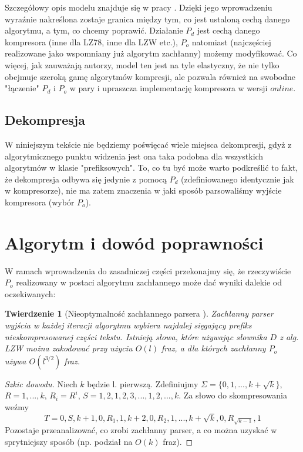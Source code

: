 \documentclass[12pt]{article}
\theoremstyle{plain}
\newtheorem{theorem}{Twierdzenie}[]
\begin{document}
Szczegółowy opis modelu znajduje się w pracy \cite{Matias98}. Dzięki jego wprowadzeniu wyraźnie nakreślona zostaje granica między tym, co jest ustaloną cechą danego algorytmu, a tym, co chcemy poprawić. Działanie $P_{d}$ jest cechą danego kompresora (inne dla LZ78, inne dla LZW etc.), $P_{o}$ natomiast (najczęściej realizowane jako wspomniany już algorytm zachłanny) możemy modyfikować.
Co więcej, jak zauważają autorzy, model ten jest na tyle elastyczny, że nie tylko obejmuje szeroką gamę algorytmów kompresji, ale pozwala również na swobodne "łączenie" $P_{d}$ i $P_{o}$ w pary i upraszcza implementację kompresora w wersji $online$.
\subsection{Dekompresja}
W niniejszym tekście nie będziemy poświęcać wiele miejsca dekompresji, gdyż z algorytmicznego punktu widzenia jest ona taka podobna dla wszystkich algorytmów w klasie "prefiksowych". To, co tu być może warto podkreślić to fakt, że dekompresja odbywa się jedynie z pomocą $P_{d}$ (zdefiniowanego identycznie jak w kompresorze), nie ma zatem znaczenia w jaki sposób parsowaliśmy wyjście kompresora (wybór $P_{o}$).
\newpage
\section{Algorytm i dowód poprawności}
W ramach wprowadzenia do zasadniczej części przekonajmy się, że rzeczywiście  $P_{o}$ realizowany w postaci algorytmu zachłannego może dać wyniki dalekie od oczekiwanych:

\begin{theorem}[Nieoptymalność zachłannego parsera \cite{DBLP:conf/soda/MatiasS99}]
Zachłanny parser wyjścia w każdej iteracji algorytmu wybiera najdalej sięgający prefiks nieskompresowanej części tekstu. Istnieją słowa, które używając słownika $D$ z alg. LZW można zakodować przy użyciu $O(l)$ fraz, a dla których zachłanny $P_{o}$ używa $O(l^{3/2})$ fraz.
\end{theorem}
\begin{proof}[Szkic dowodu]
Niech $k$ będzie l. pierwszą. Zdefiniujmy $\Sigma=\{0,1,...,k+\sqrt{k}\}$, $R=1,...,k$, $R_{i} = R^{i}$, $S=1,2,1,2,3,...,1,2,...,k$. Za słowo do skompresowania weźmy \[T=0,S,k+1,0,R_{1},1,k+2,0,R_{2},1,...,k+\sqrt{k},0,R_{\sqrt{k-1}},1\]
Pozostaje przeanalizować, co zrobi zachłanny parser, a co można uzyskać w sprytniejszy sposób (np. podział na $O(k)$ fraz).
\end{proof}
\end{document}
